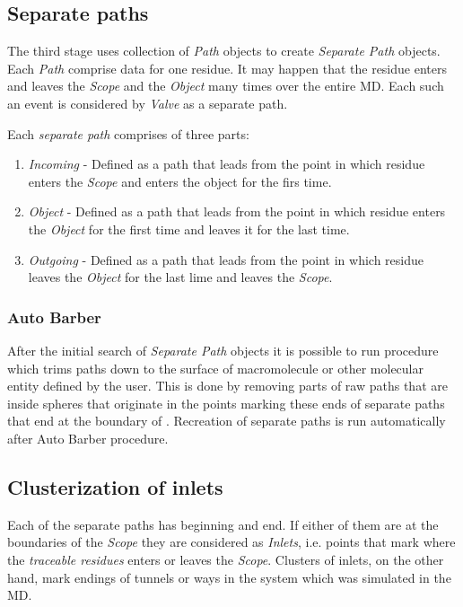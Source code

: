 \documentclass[a4paper,10pt,english]{sphinxmanual}
\begin{document}
\subsection{Separate paths}
\label{valve/valve_manual:separate-paths}
The third stage uses collection of \emph{Path} objects to create \emph{Separate Path} objects. Each \emph{Path} comprise data for one residue. It may happen that the residue enters and leaves the \emph{Scope} and the \emph{Object} many times over the entire MD. Each such an event is considered by \emph{Valve} as a separate path.

Each \emph{separate path} comprises of three parts:
\begin{enumerate}
\item {} 
\emph{Incoming} - Defined as a path that leads from the point in which residue enters the \emph{Scope} and enters the object for the firs time.

\item {} 
\emph{Object} - Defined as a path that leads from the point in which residue enters the \emph{Object} for the first time and leaves it for the last time.

\item {} 
\emph{Outgoing} - Defined as a path that leads from the point in which residue leaves the \emph{Object} for the last lime and leaves the \emph{Scope}.

\end{enumerate}


\subsubsection{Auto Barber}
\label{valve/valve_manual:auto-barber-procedure}\label{valve/valve_manual:auto-barber}
After the initial search of \emph{Separate Path} objects it is possible to run procedure which trims paths down to the surface of macromolecule or other molecular entity defined by the user. This is done by removing parts of raw paths that are inside spheres that originate in the points marking these ends of separate paths that end at the boundary of . Recreation of separate paths is run automatically after Auto Barber procedure.


\subsection{Clusterization of inlets}
\label{valve/valve_manual:clusterization-of-inlets}\label{valve/valve_manual:id3}
Each of the separate paths has beginning and end. If either of them are at the boundaries of the \emph{Scope} they are considered as \emph{Inlets}, i.e. points that mark where the \emph{traceable residues} enters or leaves the \emph{Scope}. Clusters of inlets, on the other hand, mark endings of tunnels or ways in the system which was simulated in the MD.
\end{document}
